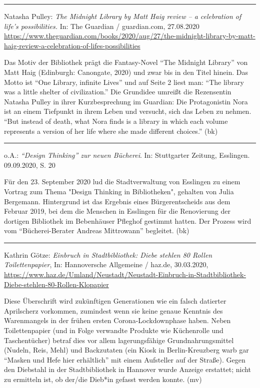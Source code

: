 \documentclass[a4paper,
fontsize=11pt,
oneside,
numbers=noperiodatend,
parskip=half-,
bibliography=totoc,
final
]{scrartcl}
\begin{document}
\begin{center}\rule{0.5\linewidth}{0.5pt}\end{center}

Natasha Pulley: \emph{The Midnight Library by Matt Haig review -- a
celebration of life's possibilities.} In: The Guardian / guardian.com,
27.08.2020
\url{https://www.theguardian.com/books/2020/aug/27/the-midnight-library-by-matt-haig-review-a-celebration-of-lifes-possibilities}

Das Motiv der Bibliothek prägt die Fantasy-Novel \enquote{The Midnight
Library} von Matt Haig (Edinburgh: Canongate, 2020) und zwar bis in den
Titel hinein. Das Motto ist \enquote{One Library, infinite Lives} und
auf Seite 2 liest man: \enquote{The library was a little shelter of
civilization.} Die Grundidee umreißt die Rezensentin Natasha Pulley in
ihrer Kurzbesprechung im Guardian: Die Protagonistin Nora ist an einem
Tiefpunkt in ihrem Leben und versucht, sich das Leben zu nehmen.
\enquote{But instead of death, what Nora finds is a library in which
each volume represents a version of her life where she made different
choices.} (bk)

\begin{center}\rule{0.5\linewidth}{0.5pt}\end{center}

o.A.: \emph{\enquote{Design Thinking} zur neuen Bücherei}. In:
Stuttgarter Zeitung, Esslingen. 09.09.2020, S. 20

Für den 23. September 2020 lud die Stadtverwaltung von Esslingen zu
einem Vortrag zum Thema "Design Thinking in Bibliotheken", gehalten von
Julia Bergemann. Hintergrund ist das Ergebnis eines Bürgerentscheids aus
dem Februar 2019, bei dem die Menschen in Esslingen für die Renovierung
der dortigen Bibliothek im Bebenhäuser Pfleghof gestimmt hatten. Der
Prozess wird vom \enquote{Bücherei-Berater Andreas Mittrowann}
begleitet. (bk)

\begin{center}\rule{0.5\linewidth}{0.5pt}\end{center}

Kathrin Götze: \emph{Einbruch in Stadtbibliothek: Diebe stehlen 80
Rollen Toilettenpapier}, In: Hannoversche Allgemeine / haz.de,
30.03.2020,
\url{https://www.haz.de/Umland/Neustadt/Neustadt-Einbruch-in-Stadtbibliothek-Diebe-stehlen-80-Rollen-Klopapier}

Diese Überschrift wird zukünftigen Generationen wie ein falsch datierter
Aprilscherz vorkommen, zumindest wenn sie keine genaue Kenntnis des
Warenmangels in der frühen ersten Corona-Lockdownphase haben. Neben
Toilettenpapier (und in Folge verwandte Produkte wie Küchenrolle und
Taschentücher) betraf dies vor allem lagerungsfähige Grundnahrungsmittel
(Nudeln, Reis, Mehl) und Backzutaten (ein Kiosk in Berlin-Kreuzberg warb
gar \enquote{Masken und Hefe hier erhältlich} mit einem Aufsteller auf
der Straße). Gegen den Diebstahl in der Stadtbibliothek in Hannover
wurde Anzeige erstattet; nicht zu ermitteln ist, ob der/die Dieb*in
gefasst werden konnte. (mv)
\end{document}
